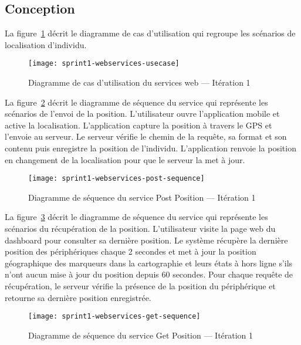 \subsection{Conception}

La figure~\ref{fig:sprint1-webservices-usecase} décrit le diagramme
de cas d'utilisation qui regroupe les scénarios de localisation d'individu.

\begin{figure}[H]
    \centering
    \texttt{[image: sprint1-webservices-usecase]}
    \caption{Diagramme de cas d'utilisation du services web --- Itération 1}
\label{fig:sprint1-webservices-usecase}
\end{figure}

La figure~\ref{fig:sprint1-webservices-post-sequence} décrit le diagramme de
séquence du service  qui représente les scénarios de
l'envoi de la position. L'utilisateur ouvre l'application mobile et active la
localisation. L'application capture la position à travers le GPS et l'envoie au
serveur. Le serveur vérifie le chemin de la requête, sa format et son contenu
puis enregistre la position de l'individu. L'application renvoie la position en
changement de la localisation pour que le serveur la met à jour.

\begin{figure}[H]
    \centering
    \texttt{[image: sprint1-webservices-post-sequence]}
    \caption{Diagramme de séquence du service Post Position --- Itération 1}
\label{fig:sprint1-webservices-post-sequence}
\end{figure}

La figure~\ref{fig:sprint1-webservices-get-sequence} décrit le diagramme de
séquence du service  qui représente les scénarios du
récupération de la position. L'utilisateur visite la page web du dashboard pour
consulter sa dernière position.  Le système récupère la dernière position des
périphériques chaque 2 secondes et met à jour la position géographique des
marqueurs dans la cartographie et leurs états à hors ligne s'ils n'ont aucun
mise à jour du position depuis 60 secondes. Pour chaque requête de
récupération, le serveur vérifie la présence de la position du périphérique et
retourne sa dernière position enregistrée.

\begin{figure}[H]
    \centering
    \texttt{[image: sprint1-webservices-get-sequence]}
    \caption{Diagramme de séquence du service Get Position --- Itération 1}
\label{fig:sprint1-webservices-get-sequence}
\end{figure}

